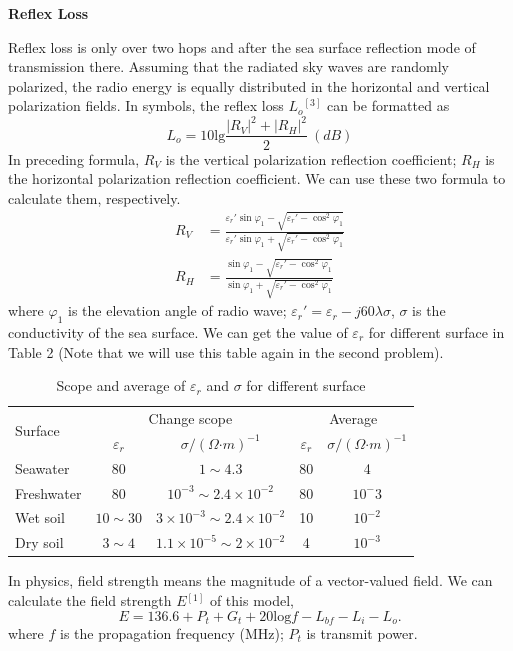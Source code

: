 \documentclass{mcmthesis}
\begin{document}
\textbf{Reflex Loss}

Reflex loss is only over two hops and after the sea surface reflection mode of transmission there. Assuming that the radiated sky waves are randomly polarized, the radio energy is equally distributed in the horizontal and vertical polarization fields. In symbols, the reflex loss $L_o$$^{[3]}$ can be formatted as 
\begin{equation}
L_o = 10\mathrm{lg}\displaystyle\frac{|R_V|^2 + |R_H|^2}{2}~ (dB) 
\end{equation}
In preceding formula, $R_V$ is the vertical polarization reflection coefficient; $R_H$ is the horizontal polarization reflection coefficient. We can use these two formula to calculate them, respectively.
\begin{align}
R_V &= \displaystyle\frac{\varepsilon_r'\sin \varphi_1-\sqrt{\varepsilon_r'-\cos^2\varphi_1}}{
\varepsilon_r'\sin \varphi_1+\sqrt{\varepsilon_r'-\cos^2\varphi_1}
}\\
R_H &= \frac{\sin \varphi_1-\sqrt{\varepsilon_r'-\cos^2\varphi_1}}{
\sin \varphi_1+\sqrt{\varepsilon_r'-\cos^2\varphi_1}}
\end{align}
where $\varphi_1$ is the elevation angle of radio wave; $\varepsilon_r' = \varepsilon_r - j60\lambda\sigma$, $\sigma$ is the conductivity of the sea surface. We can get the value of $\varepsilon_r$ for different surface in Table 2 (Note that we will use this table again in the second problem). 
\begin{longtable}{l cccc}
\caption{Scope and average of $\varepsilon_r$ and $\sigma$ for different surface} \\
\toprule
 \multirow{2}{*}{Surface} & \multicolumn{2}{c}{Change scope} & \multicolumn{2}{c}{Average} \\
\cmidrule(lr){2-3} \cmidrule(lr){4-5}
     & $\varepsilon_r$  & $\sigma/(\Omega\bm\cdot m)^{-1}$   & $\varepsilon_r$  & $\sigma/(\Omega\bm\cdot m)^{-1}$ \\
\midrule
Seawater  & 80 & $1\sim 4.3$ & 80 & 4    \\
Freshwater  & 80 & $10^{-3}\sim 2.4\times 10^{-2}$ & 80 & $10^-3$ \\
Wet soil & $10\sim 30$ & $3\times 10^{-3}\sim 2.4\times 10^{-2}$ & 10 & $10^{-2}$ \\
Dry soil & $3 \sim 4$ & $1.1\times 10^{-5}\sim 2\times 10^{-2}$ & 4 & $10^{-3}$\\
\bottomrule
\end{longtable}


In physics, field strength means the magnitude of a vector-valued field. We can calculate the field strength $E$$^{[1]}$ of this model, 
\begin{equation}
E = 136.6+P_t+G_t+20\mathrm{log} f-L_{bf}-L_i-L_o. 
\end{equation}
where $f$ is the propagation frequency (MHz); $P_t$ is transmit power.
\end{document}
